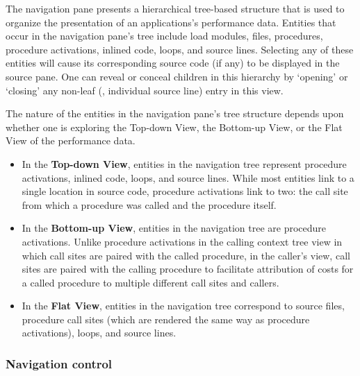 The navigation pane presents a hierarchical tree-based structure that is used to organize the presentation of an applications's performance data.
Entities that occur in the navigation pane's tree include load modules, files, procedures, procedure activations, inlined code, loops, and source lines.
Selecting any of these entities will cause its corresponding source code (if any) to be displayed in the source pane.
One can reveal or conceal children in this hierarchy by `opening' or `closing' any non-leaf (\ie{}, individual source line) entry in this view.

The nature of the entities in the navigation pane's tree structure depends upon whether one is exploring the Top-down View, the Bottom-up View, or the Flat View of the performance data.
\begin{itemize}
\item In the \textbf{Top-down View}, entities in the navigation tree represent procedure activations, inlined code, loops, and source lines.
  While most entities link to a single location in source code, procedure activations link to two: the call site from which a procedure was called and the procedure itself.

\item In the \textbf{Bottom-up View}, entities in the navigation tree are procedure activations.
  Unlike procedure activations in the calling context tree view in which call sites are paired with the called procedure, in the caller's view, call sites are paired with the calling procedure to facilitate attribution of costs for a called procedure to multiple different call sites and callers.

\item In the \textbf{Flat View}, entities in the navigation tree correspond to source files, procedure call sites (which are rendered the same way as procedure activations), loops, and source lines.
\end{itemize}

\subsubsection{Navigation control}

